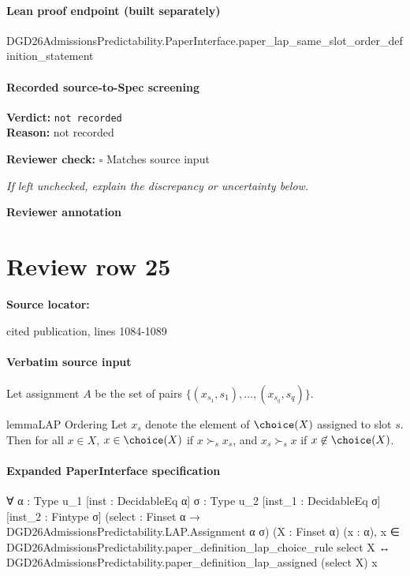 \documentclass[10pt]{article}
\newcommand{\reviewerbox}{%
  \par\noindent\fbox{\parbox{0.96\linewidth}{\rule{0pt}{0.38in}}}\par
}
\newcommand{\reviewmatch}[1]{%
  \par\noindent\textbf{Reviewer check:} $\square$\; #1\par
  \noindent\emph{If left unchecked, explain the discrepancy or uncertainty below.}\par
}
\begin{document}
\paragraph{Lean proof endpoint (built separately)}\begin{ReviewVerbatim}
DGD26AdmissionsPredictability.PaperInterface.paper_lap_same_slot_order_definition_statement
\end{ReviewVerbatim}

\paragraph{Recorded source-to-Spec screening}
\textbf{Verdict:} \texttt{not recorded}
\\
\textbf{Reason:} not recorded
\reviewmatch{Matches source input}
\noindent\textbf{Reviewer annotation}\par
\reviewerbox
\clearpage
\hypertarget{source-claim-be70d394f2bee79c}{}
\section*{Review row 25}
\textbf{Source locator:} {\footnotesize\raggedright cited publication, lines 1084-\allowbreak{}1089\par}
\paragraph{Verbatim source input}
\begin{ReviewVerbatim}
Let assignment $A$ be the set of pairs $\{(x_{s_1}, s_1), ..., (x_{s_q}, s_q)\}$.

\begin{restatable}{lemma}{LAP Ordering}
\label{lem:lap-ordering}
Let $x_{s}$ denote the element of $\choice(X)$ assigned to slot $s$. Then for all $x \in X$, $x \in \choice(X)$ if $x \succ_s x_s$, and $x_s \succ_s x$ if $x \not\in \choice(X)$.
\end{restatable}
\end{ReviewVerbatim}


\paragraph{Expanded PaperInterface specification}
\begin{ReviewVerbatim}
∀ {α : Type u_1} [inst : DecidableEq α] {σ : Type u_2} [inst_1 : DecidableEq σ] [inst_2 : Fintype σ]
  (select : Finset α → DGD26AdmissionsPredictability.LAP.Assignment α σ) (X : Finset α) (x : α),
  x ∈ DGD26AdmissionsPredictability.paper_definition_lap_choice_rule select X ↔
    DGD26AdmissionsPredictability.paper_definition_lap_assigned (select X) x
\end{ReviewVerbatim}
\end{document}
